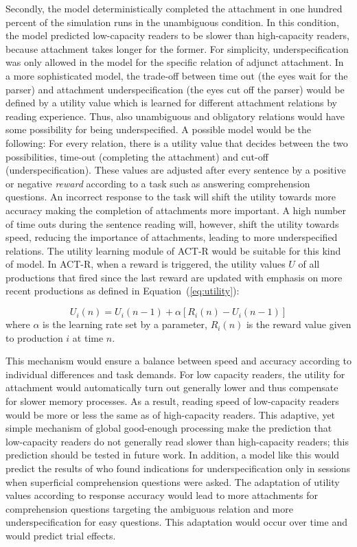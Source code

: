 \documentclass{cambridge7A}\usepackage[]{graphicx}\usepackage[]{color}
\begin{document}
Secondly, the model deterministically completed the attachment in one hundred percent of the simulation runs in the unambiguous condition. In this condition, the model predicted low-capacity readers to be slower than high-capacity readers, because attachment takes longer for the former. For simplicity, underspecification was only allowed in the model for the specific relation of adjunct attachment.
In a more sophisticated model, the trade-off between time out (the eyes wait for the parser) and attachment underspecification (the eyes cut off the parser) would be defined by a utility value which is learned for different attachment relations by reading experience. Thus, also unambiguous and obligatory relations would have some possibility for being underspecified. 
A possible model would be the following:
For every relation, there is a utility value that decides between the two possibilities, time-out (completing the attachment) and cut-off (underspecification). These values are adjusted after every sentence by a positive or negative \emph{reward} according to a task such as answering comprehension questions. An incorrect response to the task will shift the utility towards more accuracy making the completion of attachments more important. A high number of time outs during the sentence reading will, however, shift the utility towards speed, reducing the importance of attachments, leading to more underspecified relations. 
The utility learning module of ACT-R would be suitable for this kind of model. In ACT-R, when a reward is triggered, the utility values $U$ of all productions that fired since the last reward are updated with emphasis on more recent productions as defined in Equation~(\ref{eq:utility}):

\begin{equation}
\label{eq:utility}
U_i(n) = U_i(n-1) + \alpha[R_i(n)-U_i(n-1)]
\end{equation}
where $\alpha$ is the learning rate set by a parameter, $R_i(n)$ is the reward value given to production $i$ at time $n$.

This mechanism would ensure a balance between speed and accuracy according to individual differences and task demands.
For low capacity readers, the utility for attachment would automatically turn out generally lower and thus compensate for slower memory processes. As a result, reading speed of low-capacity readers would be more or less the same as of high-capacity readers. This adaptive, yet simple mechanism of global good-enough processing make the prediction that low-capacity readers do not generally read slower than high-capacity readers; this prediction should be tested in future work.
In addition, a model like this would predict the results of \cite{SwetsDesmetClifton2008} who found indications for underspecification only in sessions when superficial comprehension questions were asked. The adaptation of utility values according to response accuracy would lead to more attachments for comprehension questions targeting the ambiguous relation and more underspecification for easy questions. This adaptation would occur over time and would predict trial effects.
\end{document}
